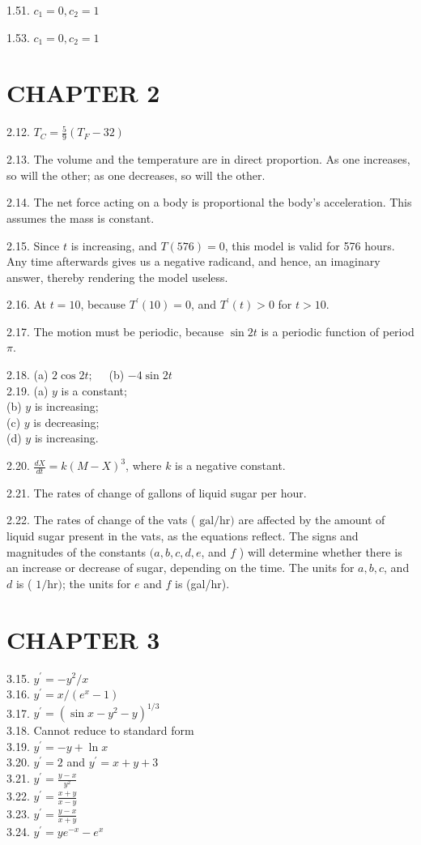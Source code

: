 \documentclass[10pt]{article}
\begin{document}
1.51. $c_{1}=0, c_{2}=1$

1.53. $c_{1}=0, c_{2}=1$

\section*{CHAPTER 2}
2.12. $T_{C}=\frac{5}{9}\left(T_{F}-32\right)$

2.13. The volume and the temperature are in direct proportion. As one increases, so will the other; as one decreases, so will the other.

2.14. The net force acting on a body is proportional the body's acceleration. This assumes the mass is constant.

2.15. Since $t$ is increasing, and $T(576)=0$, this model is valid for 576 hours. Any time afterwards gives us a negative radicand, and hence, an imaginary answer, thereby rendering the model useless.

2.16. At $t=10$, because $T^{\prime}(10)=0$, and $T^{\prime}(t)>0$ for $t>10$.

2.17. The motion must be periodic, because $\sin 2 t$ is a periodic function of period $\pi$.

2.18. (a) $2 \cos 2 t ; \quad$ (b) $-4 \sin 2 t$\\
2.19. (a) $y$ is a constant;\\
(b) $y$ is increasing;\\
(c) $y$ is decreasing;\\
(d) $y$ is increasing.

2.20. $\frac{d X}{d t}=k(M-X)^{3}$, where $k$ is a negative constant.

2.21. The rates of change of gallons of liquid sugar per hour.

2.22. The rates of change of the vats ( $\mathrm{gal} / \mathrm{hr})$ are affected by the amount of liquid sugar present in the vats, as the equations reflect. The signs and magnitudes of the constants $(a, b, c, d, e$, and $f$ ) will determine whether there is an increase or decrease of sugar, depending on the time. The units for $a, b, c$, and $d$ is ( $1 / \mathrm{hr})$; the units for $e$ and $f$ is (gal/hr).

\section*{CHAPTER 3}
3.15. $y^{\prime}=-y^{2} / x$\\
3.16. $y^{\prime}=x /\left(e^{x}-1\right)$\\
3.17. $y^{\prime}=\left(\sin x-y^{2}-y\right)^{1 / 3}$\\
3.18. Cannot reduce to standard form\\
3.19. $y^{\prime}=-y+\ln x$\\
3.20. $y^{\prime}=2$ and $y^{\prime}=x+y+3$\\
3.21. $y^{\prime}=\frac{y-x}{y^{2}}$\\
3.22. $y^{\prime}=\frac{x+y}{x-y}$\\
3.23. $y^{\prime}=\frac{y-x}{x+y}$\\
3.24. $y^{\prime}=y e^{-x}-e^{x}$
\end{document}

